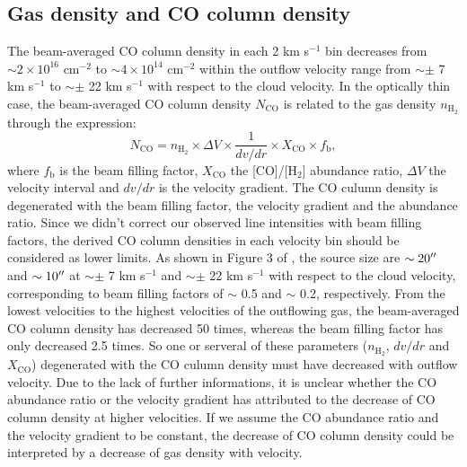 
\subsection{Gas density and CO column density}
The beam-averaged CO column density in each 2 km s$^{-1}$ bin decreases from $\sim 2 \times  10^{16} $ cm$^{-2}$ to $\sim 4 \times 10^{14}$ cm$^{-2}$ within the outflow velocity range from $\sim \pm$ 7 km s$^{-1}$ to $\sim \pm$ 22 km s$^{-1}$ with respect to the cloud velocity. In the optically thin case, the beam-averaged CO column density $N_{\mathrm{CO}}$ is related to the gas density $n_{\mathrm{H}_2}$ through the expression: 
\begin{equation}
N_{\mathrm{CO}} = n_{\mathrm{H}_2} \times \Delta V \times \frac{1}{dv/dr} \times X_{\mathrm{CO}} \times f_{\mathrm{b}}, 
\end{equation}
where $f_{\mathrm{b}}$ is the beam filling factor, $X_{\mathrm{CO}}$ the [CO]/[H$_2$] abundance ratio, $\Delta V$ the velocity interval and $dv/dr$ is the velocity gradient. The CO culumn density is degenerated with the beam filling factor, the velocity gradient and the abundance ratio. Since we didn't correct our observed line intensities with beam filling factors, the derived CO column densities in each velocity bin should be considered as lower limits. As shown in Figure 3 of \citet{2009ApJ...696...66Q}, the source size are $\sim 20\mbox{$^{\prime\prime}$}$ and $\sim 10\mbox{$^{\prime\prime}$}$ at $\sim \pm$ 7 km s$^{-1}$ and $\sim \pm$ 22 km s$^{-1}$ with respect to the cloud velocity, corresponding to beam filling factors of $\sim$ 0.5 and $\sim$ 0.2, respectively.  From the lowest velocities to the highest velocities of the outflowing gas, the beam-averaged CO column density has decreased 50 times, whereas the beam filling factor has only decreased 2.5 times. So one or serveral of these parameters ($n_{\mathrm{H}_2}$, $dv/dr$ and $X_{\mathrm{CO}}$) degenerated with the CO culumn density must have decreased with outflow velocity. Due to the lack of further informations, it is unclear whether the CO abundance ratio or the velocity gradient has attributed to the decrease of CO column density at higher velocities. If we assume the CO abundance ratio and the velocity gradient to be constant, the decrease of CO column density could be interpreted by a decrease of gas density with velocity. 
